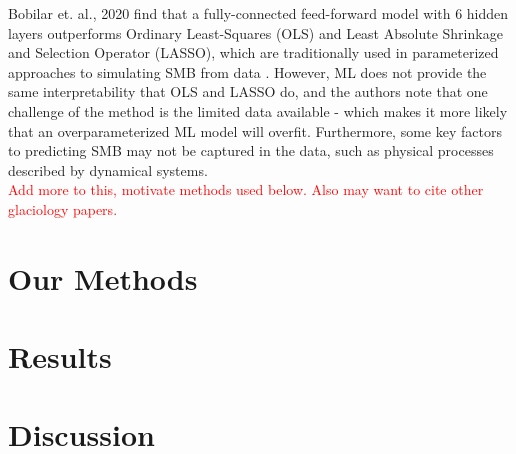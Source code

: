 \documentclass{article}
\begin{document}
Bobilar et. al., 2020 find that a fully-connected feed-forward model with 6 hidden layers outperforms Ordinary 
Least-Squares (OLS) and Least Absolute Shrinkage and Selection Operator (LASSO), which are traditionally used in 
parameterized approaches to simulating SMB from data \cite{Bobilar:etal:2020}. However, ML does not provide the 
same interpretability that OLS and LASSO do, and the authors note that one challenge of the method is the limited 
data available - which makes it more likely that an overparameterized ML model will overfit. Furthermore, some key 
factors to predicting SMB may not be captured in the data, such as physical processes described by dynamical systems. \\

\textcolor{red}{Add more to this, motivate methods used below. Also may want to cite other glaciology papers.}


\section{Our Methods}


\section{Results}


\section{Discussion}


\pagebreak


\end{document}
